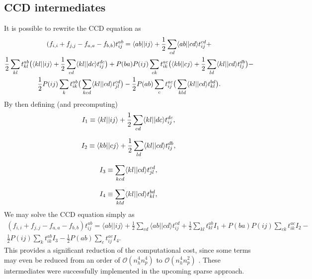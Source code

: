\subsection{CCD intermediates}

It is possible to rewrite the CCD equation as \cite{Baardsen2014}
\begin{multline}
(f_{i,i} + f_{j,j} - f_{a,a} - f_{b,b})t^{ab}_{ij} =\langle ab \vert \vert ij \rangle + 
\frac{1}{2} \sum_{cd} \langle ab \vert \vert cd \rangle t_{ij}^{cd} +\\
\frac{1}{2} \sum_{kl} t^{ab}_{kl} \big{(}  \langle kl \vert \vert ij \rangle   + \frac{1}{2} \sum_{cd}   \langle kl \vert \vert dc \rangle t_{ij}^{dc}  \big{)} +
P(ba)P(ij) \sum_{ck} t_{ik}^{ac} \big{(} \langle kb \vert \vert cj \rangle  + \frac{1}{2} \sum_{ld} \langle kl \vert \vert cd \rangle t_{lj}^{db}\big{)} - \\
\frac{1}{2}P(ij) \sum_k t^{ab}_{ik} \big{(} \sum_{kcd} \langle kl \vert \vert cd \rangle t^{cd}_{jl} \big{)} - 
\frac{1}{2}P(ab) \sum_c t^{ac}_{ij} \big{(} \sum_{kld} \langle kl \vert \vert cd \rangle t^{bd}_{kl} \big{)}.
\end{multline}
By then defining (and precomputing)
\begin{equation}
I_1 \equiv \langle kl \vert \vert ij \rangle   + \frac{1}{2} \sum_{cd}   \langle kl \vert \vert dc \rangle t_{ij}^{dc},  \\
\end{equation}

\begin{equation}
I_2 \equiv \langle kb \vert \vert cj \rangle  + \frac{1}{2} \sum_{ld} \langle kl \vert \vert cd \rangle t_{lj}^{db},  \\
\end{equation}

\begin{equation}
I_3 \equiv \sum_{kcd} \langle kl \vert \vert cd \rangle t^{cd}_{jl},  \\
\end{equation}

\begin{equation}
I_4 \equiv \sum_{kld} \langle kl \vert \vert cd \rangle t^{bd}_{kl},  \\
\end{equation}
We may solve the CCD equation simply as
\begin{multline}
(f_{i,i} + f_{j,j} - f_{a,a} - f_{b,b})t^{ab}_{ij} =\langle ab \vert \vert ij \rangle + 
\frac{1}{2} \sum_{cd} \langle ab \vert \vert cd \rangle t_{ij}^{cd} +
\frac{1}{2} \sum_{kl} t^{ab}_{kl} I_1 +
P(ba)P(ij) \sum_{ck} t_{ik}^{ac} I_2 - \\
\frac{1}{2}P(ij) \sum_k t^{ab}_{ik} I_3 - 
\frac{1}{2}P(ab) \sum_c t^{ac}_{ij} I_4.
\end{multline}
This provides a significant reduction of the computational cost, since
some terms may even be reduced from an order of
$\mathcal{O}(n_h^4n_p^4)$ to $\mathcal{O}(n_h^4n_p^2)$
\cite{Baardsen2014}. These intermediates were successfully implemented
in the upcoming sparse approach.


